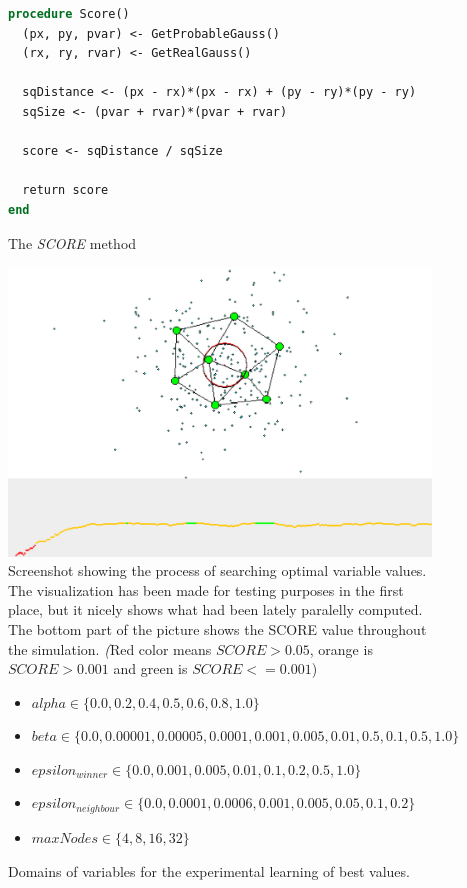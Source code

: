 \begin{figure}
\begin{lstlisting}[language=Pascal]
procedure Score()
  (px, py, pvar) <- GetProbableGauss()
  (rx, ry, rvar) <- GetRealGauss()
  
  sqDistance <- (px - rx)*(px - rx) + (py - ry)*(py - ry)
  sqSize <- (pvar + rvar)*(pvar + rvar)
  
  score <- sqDistance / sqSize
  
  return score
end
\end{lstlisting}       
\caption{The \emph{SCORE} method}
\label{usedalgo:scoremethod}
\end{figure}
       
\begin{figure}      
\begin{center}
\includegraphics[scale=0.75]{images/gng/experimental_setup.eps}    
\caption{Screenshot showing the process of searching optimal variable values. The visualization has been made for testing purposes in the first place, but it nicely shows what had been lately paralelly computed. The bottom part of the picture shows the SCORE value throughout the simulation. {\emph (Red color means $SCORE > 0.05$, orange is $SCORE > 0.001$ and green is $SCORE <= 0.001$)} }
\end{center}                          
\label{usedalgo:gngexperimentscreen}
\end{figure}

\begin{figure}          
\begin{itemize}
\item $alpha \in \{0.0, 0.2, 0.4, 0.5, 0.6, 0.8, 1.0\}$
\item $beta \in \{0.0, 0.00001, 0.00005, 0.0001, 0.001, 0.005, 0.01, 0.5, 0.1, 0.5, 1.0\}$
\item $epsilon_{winner} \in \{0.0, 0.001, 0.005, 0.01, 0.1, 0.2, 0.5, 1.0\}$
\item $epsilon_{neighbour} \in \{0.0, 0.0001, 0.0006, 0.001, 0.005, 0.05, 0.1, 0.2\}$
\item $maxNodes \in \{4, 8, 16, 32\}$
\end{itemize}
\caption{Domains of variables for the experimental learning of best values.}
\label{usedalgo:gngexperimentdomains}
\end{figure}

